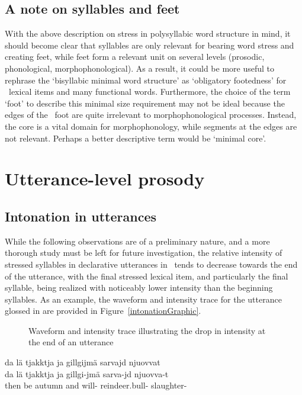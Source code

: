 \subsection{A note on syllables and feet}\label{footedness}
With the above description on stress in polysyllabic word structure in mind, it should become clear that syllables are only relevant for bearing word stress and creating feet, while feet form a relevant unit on several levels (prosodic, phonological, morphophonological). As a result, it could be more useful to rephrase the ‘bisyllabic minimal word structure’ as ‘obligatory footedness’ for \PS\ lexical items and many functional words. Furthermore, the choice of the term ‘foot’ to describe this minimal size requirement may not be ideal because the edges of the \PS\ foot are quite irrelevant to morphophonological processes. Instead, the  core is a vital domain for morphophonology, while segments at the edges are not relevant. Perhaps a better descriptive term would be ‘minimal core’.


\section{Utterance-level prosody}\label{utteranceProsody}

\subsection{Intonation in utterances}\label{utteranceIntonation}
While the following observations are of a preliminary nature, and a more thorough study must be left for future investigation, the relative intensity of stressed syllables in declarative utterances in \PS\ tends to decrease towards the end of the utterance, with the final stressed lexical item, and particularly the final syllable, being realized with noticeably lower intensity than the beginning syllables. As an example, the waveform and intensity trace for the utterance glossed in  are provided in Figure~\vref{intonationGraphic}. %
\setlength\fboxrule{0pt}
\begin{figure}[htb]
\caption{Waveform and intensity trace illustrating the drop in intensity at the end of an utterance}\label{intonationGraphic}
\end{figure}

\ea\label{intonationDropEx}
\glll	da lä tjakktja ja gillgijmä sarvajd njuovvat\\
	da lä tjakktja ja gillgi-jmä sarva-jd njuovva-t\\
	then be\BS{} autumn\BS{} and will- reindeer.bull- slaughter-\\\nopagebreak
{} 
\z 
\FB

